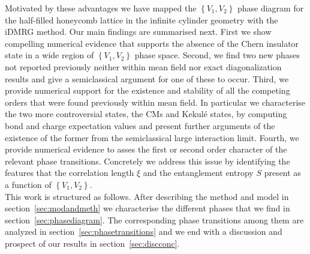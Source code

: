 \documentclass[aps,prx,10pt,twocolumn,floatfix,superscriptaddress,showpacs,numerical,footinbib]{revtex4-1}
\begin{document}
%
Motivated by these advantages we have mapped the $\left\lbrace V_{1},V_{2}\right\rbrace$ phase diagram for the half-filled honeycomb lattice in the infinite cylinder geometry
with the iDMRG method.
%
Our main findings are summarised next.
%
First we show compelling numerical evidence that supports the absence of the Chern insulator state in a wide region of $\left\lbrace V_{1},V_{2}\right\rbrace$ phase space.
%
Second, we find two new phases not reported previously neither within mean field nor exact diagonalization results and give a semiclassical argument for one 
of these to occur.
%
Third, we provide numerical support for the existence and stability of all the competing orders that were found previously within mean field.
%
In particular we characterise the two more controversial states, the CMs and Kekul\'{e} states, by computing bond and charge expectation values
and present further arguments of the existence of the former from the semiclassical large interaction limit.
%
Fourth, we provide numerical evidence to asses the first or second order character of the relevant phase transitions.
%
Concretely we address this issue by identifying the features that the correlation length $\xi$ and the entanglement entropy $S$ present as a function of $\left\lbrace V_{1},V_{2}\right\rbrace$.\\

This work is structured as follows. 
%
After describing the method and model in section~\ref{sec:modandmeth} we
characterise the different phases that we find in section~\ref{sec:phasediagram}.
%
The corresponding phase transitions among them are analyzed in section~\ref{sec:phasetransitions}
and we end with a discussion and prospect of our results in section~\ref{sec:discconc}.
\end{document}
